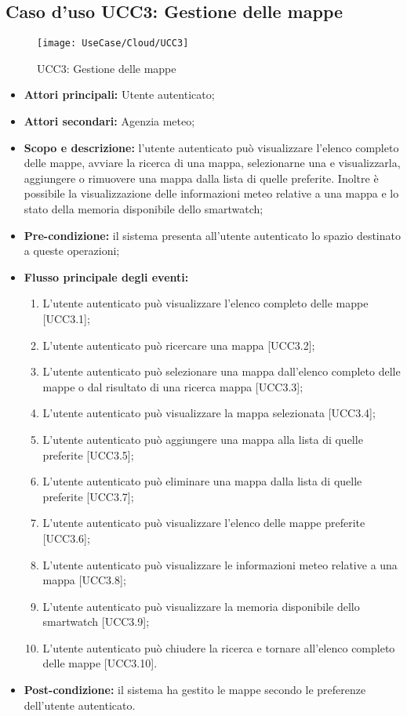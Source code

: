 \subsection{Caso d'uso UCC3: Gestione delle mappe}

\begin{figure}[H]
\centering
\texttt{[image: UseCase/Cloud/UCC3]}
\caption{UCC3: Gestione delle mappe}
\end{figure}

\begin{itemize}
\item \textbf{Attori principali:} Utente autenticato;
\item \textbf{Attori secondari:} Agenzia meteo;
\item \textbf{Scopo e descrizione:} l'utente autenticato può visualizzare l'elenco completo delle mappe, avviare la ricerca di una mappa, selezionarne una e visualizzarla, aggiungere o rimuovere una mappa dalla lista di quelle preferite. Inoltre è possibile la visualizzazione delle informazioni meteo relative a una mappa e lo stato della memoria disponibile dello smartwatch;
\item \textbf{Pre-condizione:} il sistema presenta all'utente autenticato lo spazio destinato a queste operazioni;
\item \textbf{Flusso principale degli eventi:}
\begin{enumerate}
\item L'utente autenticato può visualizzare l'elenco completo delle mappe [UCC3.1];
\item L'utente autenticato può ricercare una mappa [UCC3.2];
\item L'utente autenticato può selezionare una mappa dall'elenco completo delle mappe o dal risultato di una ricerca mappa [UCC3.3];
\item L'utente autenticato può visualizzare la mappa selezionata [UCC3.4];
\item L'utente autenticato può aggiungere una mappa alla lista di quelle preferite [UCC3.5];
\item L'utente autenticato può eliminare una mappa dalla lista di quelle preferite [UCC3.7];
\item L'utente autenticato può visualizzare l'elenco delle mappe preferite [UCC3.6];
\item L'utente autenticato può visualizzare le informazioni meteo relative a una mappa [UCC3.8];
\item L'utente autenticato può visualizzare la memoria disponibile dello smartwatch [UCC3.9];
\item L'utente autenticato può chiudere la ricerca e tornare all'elenco completo delle mappe [UCC3.10].
\end{enumerate}
\item \textbf{Post-condizione:} il sistema ha gestito le mappe secondo le preferenze dell'utente autenticato.
\end{itemize}

